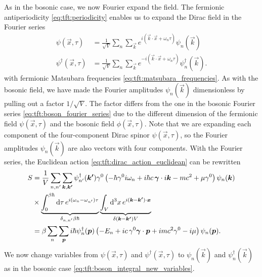 As in the bosonic case, we now Fourier expand the field.
The fermionic antiperiodicity \eqref{eq:tft:periodicity} enables us to expand the Dirac field in the Fourier series
\begin{equation}
\begin{split}
	\psi(\vec{x}, \tau)         &= \frac{1}{\sqrt{V}} \sum_n \sum_\vec{k} e^{i (\vec{k} \cdot \vec{x} + \omega_n \tau)} \psi_{n}(\vec{k}) \\
	\psi^\dagger(\vec{x}, \tau) &= \frac{1}{\sqrt{V}} \sum_n \sum_\vec{k} e^{-i (\vec{k} \cdot \vec{x} + \omega_n \tau)} \psi_{n}^\dagger(\vec{k}) .
\label{eq:tft:dirac_fourier_series}
\end{split}
\end{equation}
with fermionic Matsubara frequencies \eqref{eq:tft:matsubara_frequencies}.
As with the bosonic field, we have made the Fourier amplitudes $\psi_n(\vec{k})$ dimensionless by pulling out a factor $1/\sqrt{V}$.
The factor differs from the one in the bosonic Fourier series \eqref{eq:tft:boson_fourier_series} due to the different dimension of the fermionic field $\psi(\vec{x}, \tau)$ and the bosonic field $\phi(\vec{x}, \tau)$.
Note that we are expanding each component of the four-component Dirac spinor $\psi(\vec{x}, \tau)$, so the Fourier amplitudes $\psi_n(\vec{k})$ are also vectors with four components.
With the Fourier series, the Euclidean action \eqref{eq:tft:dirac_action_euclidean} can be rewritten
\begin{equation}
\begin{split}
	S & = \frac{1}{V} \sum_{n,n'} \sum_{{\bm{k}},{\bm{k'}}} \psi^\dagger_{n'}({\bm{k'}}) \gamma^0 \left( -\hbar \gamma^0 i \omega_n + i \hbar c \, {\bm{\gamma}} \cdot i {\bm{k}} - m c^2 + \mu \gamma^0 \right) \psi_n({\bm{k}}) \\
	  & \times \underbrace{\int_0^{\beta \hbar} \mathop{}\!\mathrm{d} \tau \, e^{i(\omega_n-\omega_{n'})\tau}}_{\delta_{n,n'} \beta \hbar} \underbrace{\int_V \mathop{}\!\mathrm{d}^3 x \, e^{i({\bm{k}}-{\bm{k'}})\cdot{\bm{x}}}}_{\delta({\bm{k}} - {\bm{k'}}) V} \\
	  & = \beta       \sum_{n}   \sum_{{\bm{p}}}         i \hbar \psi^\dagger_n({\bm{p}})          \left( -E_n + i c \, \gamma^0 {\bm{\gamma}} \cdot {\bm{p}} + i m c^2 \gamma^0 - i \mu \right) \psi_n({\bm{p}}) . \\
\end{split}
\end{equation}
We now change variables from $\psi(\vec{x}, \tau)$ and $\psi^\dagger(\vec{x}, \tau)$ to $\psi_n(\vec{k})$ and $\psi^\dagger_n(\vec{k})$ as in the bosonic case \eqref{eq:tft:boson_integral_new_variables}.

